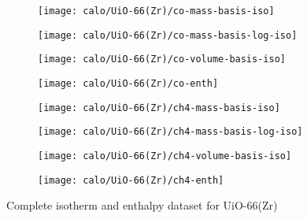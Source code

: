 \begin{figure}[H]
    \begin{subfigure}{0.25\textwidth}
        \texttt{[image: calo/UiO-66(Zr)/co-mass-basis-iso]}%
        \label{appx:fig:shaping:uio66comass}
    \end{subfigure}%
    \begin{subfigure}{0.25\textwidth}
        \texttt{[image: calo/UiO-66(Zr)/co-mass-basis-log-iso]}%
        \label{appx:fig:shaping:uio66comasslog}
    \end{subfigure}%
    \begin{subfigure}{0.25\textwidth}
        \texttt{[image: calo/UiO-66(Zr)/co-volume-basis-iso]}%
        \label{appx:fig:shaping:uio66covolume}
    \end{subfigure}%
    \begin{subfigure}{0.25\textwidth}
        \texttt{[image: calo/UiO-66(Zr)/co-enth]}%
        \label{appx:fig:shaping:uio66coenth}%
    \end{subfigure}%

    \begin{subfigure}{0.25\textwidth}
        \texttt{[image: calo/UiO-66(Zr)/ch4-mass-basis-iso]}%
        \label{appx:fig:shaping:uio66ch4mass}
    \end{subfigure}%
    \begin{subfigure}{0.25\textwidth}
        \texttt{[image: calo/UiO-66(Zr)/ch4-mass-basis-log-iso]}%
        \label{appx:fig:shaping:uio66ch4masslog}
    \end{subfigure}%
    \begin{subfigure}{0.25\textwidth}
        \texttt{[image: calo/UiO-66(Zr)/ch4-volume-basis-iso]}%
        \label{appx:fig:shaping:uio66ch4volume}
    \end{subfigure}%
    \begin{subfigure}{0.25\textwidth}
        \texttt{[image: calo/UiO-66(Zr)/ch4-enth]}%
        \label{appx:fig:shaping:uio66ch4enth}%
    \end{subfigure}%

    \caption{Complete isotherm and enthalpy dataset for UiO-66(Zr)}
\end{figure}

